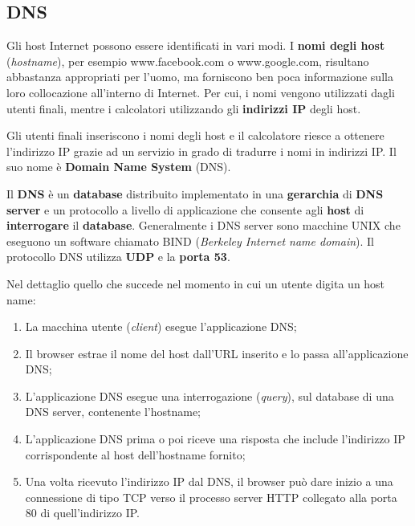 \documentclass[a4paper]{article}
\begin{document}
	\subsection{DNS}
	
	Gli host Internet possono essere identificati in vari modi. I \textbf{nomi degli host} (\emph{hostname}), per esempio \textsf{www.facebook.com} o \textsf{www.google.com}, risultano abbastanza appropriati per l’uomo, ma forniscono ben poca informazione sulla loro collocazione all’interno di Internet. Per cui, i nomi vengono utilizzati dagli utenti finali, mentre i calcolatori utilizzando gli \textbf{indirizzi IP} degli host.\newline
	
	\noindent
	Gli utenti finali inseriscono i nomi degli host e il calcolatore riesce a ottenere l’indirizzo IP grazie ad un servizio in grado di tradurre i nomi in indirizzi IP. Il suo nome è \textcolor{Red3}{\textbf{Domain Name System}} (DNS).\newline
	
	\noindent
	Il \textbf{DNS} è un \textbf{database} distribuito implementato in una \textbf{gerarchia} di \textbf{DNS server} e un protocollo a livello di applicazione che consente agli \textbf{host} di \textbf{interrogare} il \textbf{database}. Generalmente i DNS server sono macchine UNIX che eseguono un software chiamato BIND (\emph{Berkeley Internet name domain}). Il protocollo DNS utilizza \textbf{UDP} e la \textbf{porta 53}.\newline
	
	\noindent
	Nel dettaglio quello che succede nel momento in cui un utente digita un host name:
	
	\begin{enumerate}
		\item La macchina utente (\emph{client}) esegue l’applicazione DNS;

		\item Il browser estrae il nome del host dall’URL inserito e lo passa all’applicazione DNS;

		\item L’applicazione DNS esegue una interrogazione (\emph{query}), sul database di una DNS server, contenente l’hostname;

		\item L’applicazione DNS prima o poi riceve una risposta che include l’indirizzo IP corrispondente al host dell’hostname fornito;

		\item Una volta ricevuto l’indirizzo IP dal DNS, il browser può dare inizio a una connessione di tipo TCP verso il processo server HTTP collegato alla porta 80 di quell’indirizzo IP.
	\end{enumerate}
\end{document}

